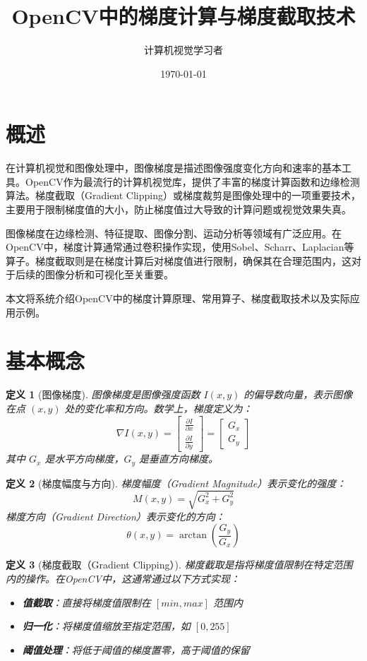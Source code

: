 \documentclass{article}
\title{\textbf{OpenCV中的梯度计算与梯度截取技术}}
\author{计算机视觉学习者}
\date{\today}
\newtheorem{definition}{定义}[section]
\begin{document}
\maketitle

\tableofcontents
\newpage

\section{概述}
在计算机视觉和图像处理中，图像梯度是描述图像强度变化方向和速率的基本工具。OpenCV作为最流行的计算机视觉库，提供了丰富的梯度计算函数和边缘检测算法。梯度截取（Gradient Clipping）或梯度裁剪是图像处理中的一项重要技术，主要用于限制梯度值的大小，防止梯度值过大导致的计算问题或视觉效果失真。

图像梯度在边缘检测、特征提取、图像分割、运动分析等领域有广泛应用。在OpenCV中，梯度计算通常通过卷积操作实现，使用Sobel、Scharr、Laplacian等算子。梯度截取则是在梯度计算后对梯度值进行限制，确保其在合理范围内，这对于后续的图像分析和可视化至关重要。

本文将系统介绍OpenCV中的梯度计算原理、常用算子、梯度截取技术以及实际应用示例。

\section{基本概念}

\begin{definition}[图像梯度]
图像梯度是图像强度函数 $I(x,y)$ 的偏导数向量，表示图像在点 $(x,y)$ 处的变化率和方向。数学上，梯度定义为：
\[
\nabla I(x,y) = \begin{bmatrix}
\frac{\partial I}{\partial x} \\
\frac{\partial I}{\partial y}
\end{bmatrix} = \begin{bmatrix}
G_x \\
G_y
\end{bmatrix}
\]
其中 $G_x$ 是水平方向梯度，$G_y$ 是垂直方向梯度。
\end{definition}

\begin{definition}[梯度幅度与方向]
梯度幅度（Gradient Magnitude）表示变化的强度：
\[
M(x,y) = \sqrt{G_x^2 + G_y^2}
\]
梯度方向（Gradient Direction）表示变化的方向：
\[
\theta(x,y) = \arctan\left(\frac{G_y}{G_x}\right)
\]
\end{definition}

\begin{definition}[梯度截取（Gradient Clipping）]
梯度截取是指将梯度值限制在特定范围内的操作。在OpenCV中，这通常通过以下方式实现：
\begin{itemize}
    \item \textbf{值截取}：直接将梯度值限制在 $[min, max]$ 范围内
    \item \textbf{归一化}：将梯度值缩放至指定范围，如 $[0, 255]$
    \item \textbf{阈值处理}：将低于阈值的梯度置零，高于阈值的保留
\end{itemize}
\end{definition}
\end{document}
